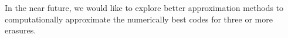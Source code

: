 \documentclass{sig-alternate}
\begin{document}
In the near future, we would like to explore better approximation methods to 
computationally approximate the numerically best codes 
for three or more erasures.




%


%



%


\end{document}
